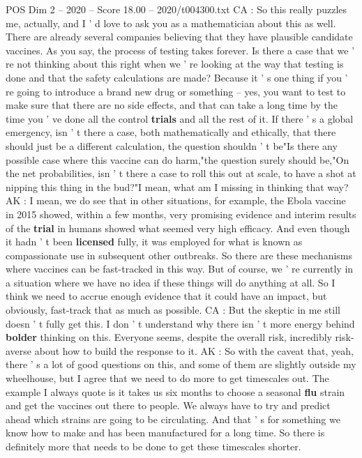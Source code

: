 \begin{textsample}{POS Dim 2 – 2020 – Score 18.00 – 2020/t004300.txt}
CA : So this really puzzles me, actually, and I ' d love to ask you as a mathematician about this as well.
There are already several companies believing that they have plausible candidate vaccines.
As you say, the process of testing takes forever.
Is there a case that we ' re not thinking about this right when we ' re looking at the way that testing is done and that the safety calculations are made?
Because it ' s one thing if you ' re going to introduce a brand new drug or something -- yes, you want to test to make sure that there are no side effects, and that can take a long time by the time you ' ve done all the control \textbf{trials} and all the rest of it.
If there ' s a global emergency, isn ' t there a case, both mathematically and ethically, that there should just be a different calculation, the question shouldn ' t be"Is there any possible case where this vaccine can do harm,"the question surely should be,"On the net probabilities, isn ' t there a case to roll this out at scale, to have a shot at nipping this thing in the bud?"I mean, what am I missing in thinking that way?
AK : I mean, we do see that in other situations, for example, the Ebola vaccine in 2015 showed, within a few months, very promising evidence and interim results of the \textbf{trial} in humans showed what seemed very high efficacy.
And even though it hadn ' t been \textbf{licensed} fully, it was employed for what is known as compassionate use in subsequent other outbreaks.
So there are these mechanisms where vaccines can be fast-tracked in this way.
But of course, we ' re currently in a situation where we have no idea if these things will do anything at all.
So I think we need to accrue enough evidence that it could have an impact, but obviously, fast-track that as much as possible.
CA : But the skeptic in me still doesn ' t fully get this.
I don ' t understand why there isn ' t more energy behind \textbf{bolder} thinking on this.
Everyone seems, despite the overall risk, incredibly risk-averse about how to build the response to it.
AK : So with the caveat that, yeah, there ' s a lot of good questions on this, and some of them are slightly outside my wheelhouse, but I agree that we need to do more to get timescales out.
The example I always quote is it takes us six months to choose a seasonal \textbf{flu} strain and get the vaccines out there to people.
We always have to try and predict ahead which strains are going to be circulating.
And that ' s for something we know how to make and has been manufactured for a long time.
So there is definitely more that needs to be done to get these timescales shorter.

\end{textsample}
